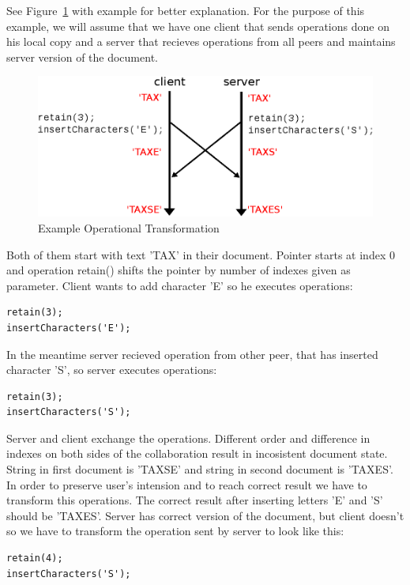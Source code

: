 \documentclass[12pt,oneside]{fithesis2}
\begin{document}
\par See Figure~\ref{fig:ot} with example for better explanation. For the purpose of this example, we will assume that we have one client that sends operations done on his local copy and a server that recieves operations from all peers and maintains server version of the document. 
\begin{figure}[H]
\caption{Example Operational Transformation}
\label{fig:ot}
\centering
\vspace{5mm}
\includegraphics{op1}
\end{figure}
Both of them start with text 'TAX' in their document. Pointer starts at index 0 and operation retain() shifts the pointer by number of indexes given as parameter. Client wants to add character 'E' so he executes operations:
\vspace{3mm}
\begin{verbatim}
retain(3);
insertCharacters('E');
\end{verbatim} 
\vspace{3mm}
In the meantime server recieved operation from other peer, that has inserted character 'S', so server executes operations:
\vspace{3mm} 
\begin{verbatim}
retain(3);
insertCharacters('S');
\end{verbatim}
\vspace{3mm}
Server and client exchange the operations. Different order and difference in indexes on both sides of the collaboration result in incosistent document state. String in first document is 'TAXSE' and string in second document is 'TAXES'.  In order to preserve user's intension and to reach correct result we have to transform this operations. The correct result after inserting letters 'E' and 'S' should be 'TAXES'. Server has correct version of the document, but client doesn't so we have to transform the operation sent by server to look like this:
\vspace{3mm}
\begin{verbatim}
retain(4);
insertCharacters('S');
\end{verbatim}
\end{document}
